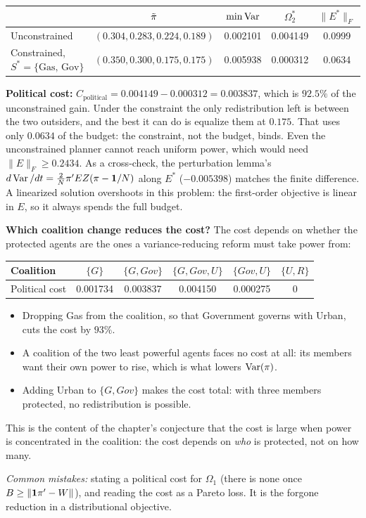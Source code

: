 \documentclass[../solutions_manual.tex]{subfiles}
\begin{document}
\begin{center}
\small\setlength{\tabcolsep}{4pt}
\begin{tabular}{lcccc}
\toprule
& $\tilde{\pi}$ & $\min\operatorname{Var}$ & $\Omega_2^*$ & $\|E^*\|_F$ \\
\midrule
Unconstrained & $(0.304,\allowbreak 0.283,\allowbreak 0.224,\allowbreak 0.189)$ & 0.002101 & 0.004149 & 0.0999 \\
Constrained, $S^* = \{\text{Gas, Gov}\}$ & $(0.350,\allowbreak 0.300,\allowbreak 0.175,\allowbreak 0.175)$ & 0.005938 & 0.000312 & 0.0634 \\
\bottomrule
\end{tabular}
\end{center}
\textbf{Political cost:} $C_{\text{political}} = 0.004149 - 0.000312 = 0.003837$, which is $92.5\%$ of the unconstrained gain. Under the constraint the only redistribution left is between the two outsiders, and the best it can do is equalize them at $0.175$. That uses only $0.0634$ of the budget: the constraint, not the budget, binds. Even the unconstrained planner cannot reach uniform power, which would need $\|E\|_F \ge 0.2434$. As a cross-check, the perturbation lemma's $d\operatorname{Var}/dt = \frac2N\pi'EZ(\pi - \mathbf{1}/N)$ along $E^*$ ($-0.005398$) matches the finite difference. A linearized solution overshoots in this problem: the first-order objective is linear in $E$, so it always spends the full budget.

\textbf{Which coalition change reduces the cost?} The cost depends on whether the protected agents are the ones a variance-reducing reform must take power from:
\begin{center}
\begin{tabular}{lccccc}
\toprule
Coalition & $\{G\}$ & $\{G, Gov\}$ & $\{G, Gov, U\}$ & $\{Gov, U\}$ & $\{U, R\}$ \\
\midrule
Political cost & 0.001734 & 0.003837 & 0.004150 & 0.000275 & 0 \\
\bottomrule
\end{tabular}
\end{center}
\begin{itemize}
\item Dropping Gas from the coalition, so that Government governs with Urban, cuts the cost by $93\%$.
\item A coalition of the two least powerful agents faces no cost at all: its members want their own power to rise, which is what lowers $\operatorname{Var}(\pi)$.
\item Adding Urban to $\{G, Gov\}$ makes the cost total: with three members protected, no redistribution is possible.
\end{itemize}
This is the content of the chapter's conjecture that the cost is large when power is concentrated in the coalition: the cost depends on \emph{who} is protected, not on how many.

\emph{Common mistakes:} stating a political cost for $\Omega_1$ (there is none once $B \ge \|\mathbf{1}\pi' - W\|$), and reading the cost as a Pareto loss. It is the forgone reduction in a distributional objective.

\endgroup
\end{document}
